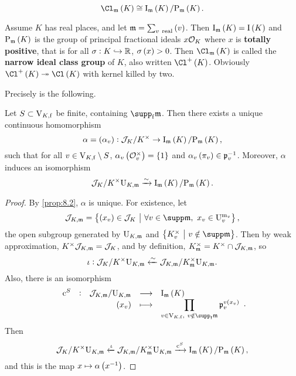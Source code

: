 \begin{theorem}
$$ \Cl_\mmm\br{K} \cong \I_\mmm\br{K} / \P_\mmm\br{K}. $$
\end{theorem}

\begin{example*}
Assume $ K $ has real places, and let $ \mmm = \sum_{v \ \text{real}} \br{v} $. Then $ \I_\mmm\br{K} = \I\br{K} $ and $ \P_\mmm\br{K} $ is the group of principal fractional ideals $ x\mathcal{O}_K $ where $ x $ is \textbf{totally positive}, that is for all $ \sigma : K \hookrightarrow \mathbb{R} $, $ \sigma\br{x} > 0 $. Then $ \Cl_\mmm\br{K} $ is called the \textbf{narrow ideal class group} of $ K $, also written $ \Cl^+\br{K} $. Obviously $ \Cl^+\br{K} \twoheadrightarrow \Cl\br{K} $ with kernel killed by two.
\end{example*}

Precisely is the following.

\begin{theorem}
Let $ S \subset \mathrm{V}_{K, \mathrm{f}} $ be finite, containing $ \supp_\f \mmm $. Then there exists a unique continuous homomorphism
$$ \alpha = \br{\alpha_v} : \JJJ_K / K^\times \to \I_\mmm\br{K} / \P_\mmm\br{K}, $$
such that for all $ v \in \mathrm{V}_{K, \mathrm{f}} \setminus S $, $ \alpha_v\br{\OOO_v^\times} = \cbr{1} $ and $ \alpha_v\br{\pi_v} \in \ppp_v^{-1} $. Moreover, $ \alpha $ induces an isomorphism
$$ \JJJ_K / K^\times\U_{K, \mmm} \xrightarrow{\sim} \I_\mmm\br{K} / \P_\mmm\br{K}. $$
\end{theorem}

\pagebreak

\begin{proof}
By \ref{prop:8.2}, $ \alpha $ is unique. For existence, let
$$ \JJJ_{K, \mmm} = \cbr{\br{x_v} \in \JJJ_K \st \forall v \in \supp \mmm, \ x_v \in \U_v^{\m_v}}, $$
the open subgroup generated by $ \mathrm{U}_{K, \mathfrak{m}} $ and $ \cbr{K_v^\times \st v \notin \supp \mmm} $. Then by weak approximation, $ K^\times\mathcal{J}_{K, \mathfrak{m}} = \mathcal{J}_K $, and by definition, $ K_{\mathfrak{m}}^\times = K^\times \cap \mathcal{J}_{K, \mathfrak{m}} $, so
$$ \iota : \mathcal{J}_K / K^\times\mathrm{U}_{K, \mathfrak{m}} \xleftarrow{\sim} \mathcal{J}_{K, \mathfrak{m}} / K_{\mathfrak{m}}^\times\mathrm{U}_{K, \mathfrak{m}}. $$
Also, there is an isomorphism
$$ \function[\c^S]{\JJJ_{K, \mmm} / \U_{K, \mmm}}{\I_\mmm\br{K}}{\br{x_v}}{\prod_{v \in \V_{K, \f}, \ v \notin \supp_\f \mmm} \ppp_v^{v\br{x_v}}}. $$
Then
$$ \JJJ_K / K^\times\U_{K, \mmm} \xleftarrow{\iota} \JJJ_{K, \mmm} / K_\mmm^\times\U_{K, \mmm} \xrightarrow{\c^S} \I_\mmm\br{K} / \P_\mmm\br{K}, $$
and this is the map $ x \mapsto \alpha\br{x^{-1}} $.
\end{proof}

